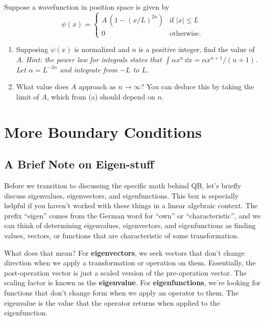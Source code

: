 \documentclass{article}
\begin{document}
\begin{tcolorbox}[colframe=blue!50!black, arc=2mm, title=\textsc{Practice 1}]
    Suppose a wavefunction in position space is given by 
    \[
    \psi(x) = \begin{cases}
    A\, (1-(x/L)^{2n}) & \text{if } |x| \le L \\
    0 & \text{otherwise}.
    \end{cases}
    \]
    \begin{enumerate}[label=(\alph*)]
    \item Supposing $\psi(x)$ is normalized and $n$ is a positive integer, find the value of $A$. \textit{Hint: the power law for integrals states that $\int \alpha x^n \, \dd x = \alpha x^{n+1} / (n+1)$. Let $\alpha = L^{-2n}$ and integrate from $-L$ to $L$.}
    \item What value does $A$ approach as $n \to \infty$? You can deduce this by taking the limit of $A$, which from (a) should depend on $n$.
    \end{enumerate}
\end{tcolorbox}

\section*{More Boundary Conditions}

\begin{tcolorbox}[arc=2mm, colback=white]
    \subsection*{A Brief Note on Eigen-stuff}
    Before we transition to discussing the specific math behind QB, let's briefly discuss eigenvalues, eigenvectors, and eigenfunctions. This box is especially helpful if you haven't worked with these things in a linear algebraic context. The prefix ``eigen'' comes from the German word for ``own'' or ``characteristic'', and we can think of determining eigenvalues, eigenvectors, and eigenfunctions as finding values, vectors, or functions that are characteristic of some transformation. 
    
    \vspace{1em}
    
    What does that mean? For \textbf{eigenvectors}, we seek vectors that don't change direction when we apply a transformation or operation on them. Essentially, the post-operation vector is just a scaled version of the pre-operation vector. The scaling factor is known as the \textbf{eigenvalue}. For \textbf{eigenfunctions}, we're looking for functions that don't change form when we apply an operator to them. The eigenvalue is the value that the operator returns when applied to the eigenfunction.
\end{tcolorbox}
\end{document}
